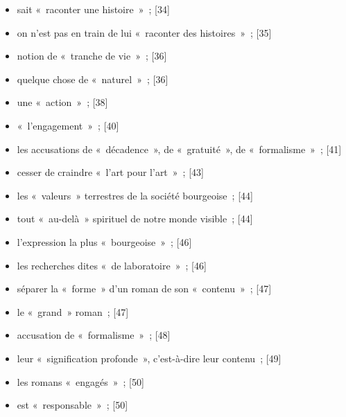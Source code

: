 \documentclass[12pt, a4paper]{article}
\begin{document}
\begin{itemize}
	\item sait «~raconter une histoire~»{\color{gray}~; [34]}

	\item on n’est pas en train de lui «~raconter des histoires~»{\color{gray}~; [35]}

	\item notion de «~tranche de vie~»{\color{gray}~; [36]}

	\item quelque chose de «~naturel~»{\color{gray}~; [36]}

	\item une «~action~»{\color{gray}~; [38]}

	\item «~l’engagement~»{\color{gray}~; [40]}

	\item les accusations de «~décadence~», de «~gratuité~», de «~formalisme~»{\color{gray}~; [41]}

	\item cesser de craindre «~l’art pour l’art~»{\color{gray}~; [43]}

	\item les «~valeurs~» terrestres de la société bourgeoise{\color{gray}~; [44]}

	\item tout «~au-delà~» spirituel de notre monde visible{\color{gray}~; [44]}

	\item l’expression la plus «~bourgeoise~»{\color{gray}~; [46]}

	\item les recherches dites «~de laboratoire~»{\color{gray}~; [46]}

	\item séparer la «~forme~» d’un roman de son «~contenu~»{\color{gray}~; [47]}

	\item le «~grand~» roman{\color{gray}~; [47]}

	\item accusation de «~formalisme~»{\color{gray}~; [48]}

	\item leur «~signification profonde~», c’est-à-dire leur contenu{\color{gray}~; [49]}

	\item les romans «~engagés~»{\color{gray}~; [50]}

	\item est «~responsable~»{\color{gray}~; [50]}


\end{itemize}
\end{document}
